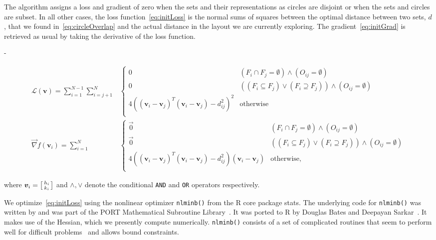 \documentclass[
  oneside,
  openany,
  numbers=noendperiod,
  parskip=half,
  bibliography=totoc
]{scrbook}\usepackage[]{graphicx}\usepackage{xcolor}
\newlength{\overhang}
\newenvironment{fullwidth}{
  \begin{addmargin*}[0em]{-\overhang}
  }{
  \end{addmargin*}
}
\newcommand{\pkg}[1]{{\fontseries{b}\selectfont #1}}
\newcommand{\code}[1]{\texttt{#1}}
\begin{document}
The algorithm assigns a loss and gradient of zero when the sets and their
representations as circles are disjoint or when the sets and circles are subset.
In all other cases, the loss function~\eqref{eq:initLoss} is the normal sums of
squares between the optimal distance between two sets, $d$, that we found
in~\eqref{eq:circleOverlap} and the actual distance in the layout we are
currently exploring. The gradient~\eqref{eq:initGrad} is retrieved as usual by
taking the derivative of the loss function.
\begin{fullwidth}
\begin{align}
\mathcal{L}(\bm{v}) = \sum_{i=1}^{N-1} \sum_{i=j+1}^{N}
& \begin{cases}
  0 & (F_i \cap F_j = \emptyset) \wedge (O_{ij} = \emptyset)\\
  0 & \left((F_i \subseteq F_j) \vee (F_i \supseteq F_j)\right) \wedge (O_{ij}=\emptyset)\\
  4 ((\bm{v}_i - \bm{v}_j)^{\scriptscriptstyle T}(\bm{v}_i - \bm{v}_j) - d_{ij}^2)^2  & \text{otherwise} \\
\end{cases} \label{eq:initLoss} \\
\vec{\nabla} f(\bm{v}_i) = \sum_{i=1}^N
& \begin{cases}
  \vec{0} & (F_i \cap F_j = \emptyset) \wedge (O_{ij} = \emptyset)\\
  \vec{0} & \left((F_i \subseteq F_j) \vee (F_i \supseteq F_j)\right) \wedge (O_{ij}=\emptyset)\\
  4 \left((\bm{v}_i - \bm{v}_j)^{\scriptscriptstyle T}(\bm{v}_i - \bm{v}_j) - d_{ij}^2\right) (\bm{v}_i - \bm{v}_j) & \text{otherwise}, \\
\end{cases} \label{eq:initGrad}
\end{align}
\end{fullwidth}
where $\bm{v}_i = \begin{bsmallmatrix}h_i \\ k_i\end{bsmallmatrix}$ and $\wedge,\vee$ denote the conditional \texttt{AND} and \texttt{OR} operators respectively.

We optimize~\eqref{eq:initLoss} using the nonlinear optimizer \code{nlminb()} from
the R core package \pkg{stats}. The underlying code for \code{nlminb()} was
written by \citet{gray_1990} and was part of the PORT Mathematical
Subroutine Library~\citep{fox_1978}. It was ported to R by Douglas Bates
and Deepayan Sarkar~\citep{RCT_2017}. It makes use of the Hessian, which we
presently compute numerically. \code{nlminb()} consists of a set of
complicated routines that seem to perform well for
difficult problems~\cite{Nash_2014} and allows bound constraints.
\end{document}
